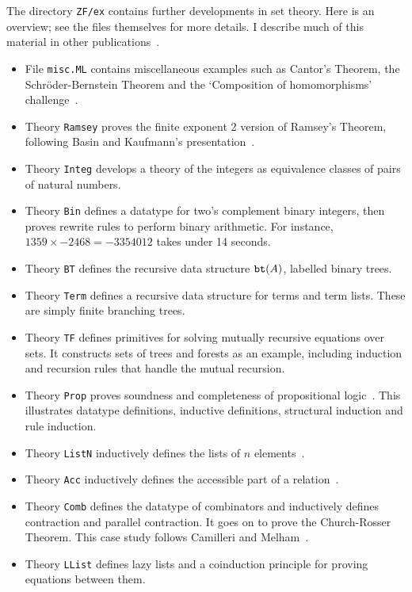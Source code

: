 The directory {\tt ZF/ex} contains further developments in {\ZF} set
theory.  Here is an overview; see the files themselves for more details.  I
describe much of this material in other
publications~\cite{paulson-set-I,paulson-set-II,paulson-CADE}. 
\begin{itemize}
\item File {\tt misc.ML} contains miscellaneous examples such as
  Cantor's Theorem, the Schr\"oder-Bernstein Theorem and the `Composition
  of homomorphisms' challenge~\cite{boyer86}.

\item Theory {\tt Ramsey} proves the finite exponent 2 version of
  Ramsey's Theorem, following Basin and Kaufmann's
  presentation~\cite{basin91}.

\item Theory {\tt Integ} develops a theory of the integers as
  equivalence classes of pairs of natural numbers.

\item Theory {\tt Bin} defines a datatype for two's complement binary
  integers, then proves rewrite rules to perform binary arithmetic.  For
  instance, $1359\times {-}2468 = {-}3354012$ takes under 14 seconds.

\item Theory {\tt BT} defines the recursive data structure ${\tt
    bt}(A)$, labelled binary trees.

\item Theory {\tt Term} defines a recursive data structure for terms
  and term lists.  These are simply finite branching trees.

\item Theory {\tt TF} defines primitives for solving mutually
  recursive equations over sets.  It constructs sets of trees and forests
  as an example, including induction and recursion rules that handle the
  mutual recursion.

\item Theory {\tt Prop} proves soundness and completeness of
  propositional logic~\cite{paulson-set-II}.  This illustrates datatype
  definitions, inductive definitions, structural induction and rule
  induction.

\item Theory {\tt ListN} inductively defines the lists of $n$
  elements~\cite{paulin92}.

\item Theory {\tt Acc} inductively defines the accessible part of a
  relation~\cite{paulin92}.

\item Theory {\tt Comb} defines the datatype of combinators and
  inductively defines contraction and parallel contraction.  It goes on to
  prove the Church-Rosser Theorem.  This case study follows Camilleri and
  Melham~\cite{camilleri92}.

\item Theory {\tt LList} defines lazy lists and a coinduction
  principle for proving equations between them.
\end{itemize}



